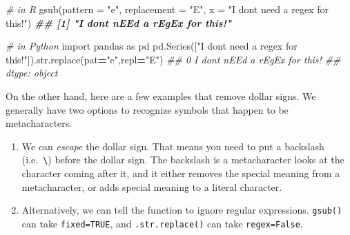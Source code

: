 \documentclass[
  12pt,
  krantz2]{krantz}
\makeatletter
\newenvironment{Shaded}{\begin{snugshade}}{\end{snugshade}}
\newcommand{\AttributeTok}[1]{\textcolor[rgb]{0.61,0.61,0.61}{#1}}
\newcommand{\BuiltInTok}[1]{#1}
\newcommand{\CommentTok}[1]{\textcolor[rgb]{0.37,0.37,0.37}{\textit{#1}}}
\newcommand{\DocumentationTok}[1]{\textcolor[rgb]{0.37,0.37,0.37}{\textbf{\textit{#1}}}}
\newcommand{\FunctionTok}[1]{\textcolor[rgb]{0,0,0}{#1}}
\newcommand{\ImportTok}[1]{#1}
\newcommand{\NormalTok}[1]{#1}
\newcommand{\OperatorTok}[1]{\textcolor[rgb]{0.43,0.43,0.43}{\textbf{#1}}}
\newcommand{\StringTok}[1]{\textcolor[rgb]{0.5,0.5,0.5}{#1}}
\newcommand{\VariableTok}[1]{\textcolor[rgb]{0,0,0}{#1}}
\providecommand{\tightlist}{%
  \setlength{\itemsep}{0pt}\setlength{\parskip}{0pt}}
\newenvironment{kframe}{%
\medskip{}
\setlength{\fboxsep}{.8em}
 \def\at@end@of@kframe{}%
 \ifinner\ifhmode%
  \def\at@end@of@kframe{\end{minipage}}%
  \begin{minipage}{\columnwidth}%
 \fi\fi%
 \def\FrameCommand##1{\hskip\@totalleftmargin \hskip-\fboxsep
 \colorbox{shadecolor}{##1}\hskip-\fboxsep
     \hskip-\linewidth \hskip-\@totalleftmargin \hskip\columnwidth}%
 \MakeFramed {\advance\hsize-\width
   \@totalleftmargin\z@ \linewidth\hsize
   \@setminipage}}%
 {\par\unskip\endMakeFramed%
 \at@end@of@kframe}
\renewenvironment{Shaded}{\begin{kframe}}{\end{kframe}}
\makeatother
\begin{document}
\begin{Shaded}
\begin{Highlighting}[]
\CommentTok{\# in R}
\FunctionTok{gsub}\NormalTok{(}\AttributeTok{pattern =} \StringTok{"e"}\NormalTok{, }\AttributeTok{replacement =} \StringTok{"E"}\NormalTok{, }\AttributeTok{x =} \StringTok{"I don\textquotesingle{}t need a regex for this!"}\NormalTok{)}
\DocumentationTok{\#\# [1] "I don\textquotesingle{}t nEEd a rEgEx for this!"}
\end{Highlighting}
\end{Shaded}

\begin{Shaded}
\begin{Highlighting}[]
\CommentTok{\# in Python}
\ImportTok{import}\NormalTok{ pandas }\ImportTok{as}\NormalTok{ pd}
\NormalTok{pd.Series([}\StringTok{"I don\textquotesingle{}t need a regex for this!"}\NormalTok{]).}\BuiltInTok{str}\NormalTok{.replace(pat}\OperatorTok{=}\StringTok{"e"}\NormalTok{,repl}\OperatorTok{=}\StringTok{"E"}\NormalTok{)}
\CommentTok{\#\# 0    I don\textquotesingle{}t nEEd a rEgEx for this!}
\CommentTok{\#\# dtype: object}
\end{Highlighting}
\end{Shaded}

On the other hand, here are a few examples that remove dollar signs. We generally have two options to recognize symbols that happen to be metacharacters.

\begin{enumerate}
\def\labelenumi{\arabic{enumi}.}
\tightlist
\item
  We can \emph{escape} the dollar sign. That means you need to put a backslash (i.e.~\texttt{\textbackslash{}}) before the dollar sign. The backslash is a metacharacter looks at the character coming after it, and it either removes the special meaning from a metacharacter, or adds special meaning to a literal character.
\item
  Alternatively, we can tell the function to ignore regular expressions. \texttt{gsub()} can take \texttt{fixed=TRUE}, and \texttt{.str.replace()} can take \texttt{regex=False}.
\end{enumerate}

\begin{Shaded}
\end{Shaded}
\end{document}
